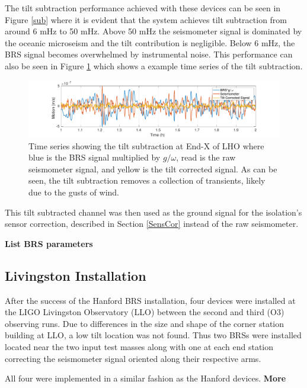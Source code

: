 \documentclass [12pt, proquest]{uwthesis}[2019]
\begin{document}
The tilt subtraction performance achieved with these devices can be seen in Figure \ref{sub} where it is evident that the system achieves tilt subtraction from around 6 mHz to 50 mHz. Above 50 mHz the seismometer signal is dominated by the oceanic microseism and the tilt contribution is negligible. Below 6 mHz, the BRS signal becomes overwhelmed by instrumental noise. This performance can also be seen in Figure \ref{subTime} which shows a example time series of the tilt subtraction. 

\begin{figure}%
\begin{center}
\includegraphics[width=\textwidth]{TiltCorrTime.pdf}
\caption[Time series showing tilt subtraction ]{Time series showing the tilt subtraction at End-X of LHO where blue is the BRS signal multiplied by $g/\omega$, read is the raw seismometer signal, and yellow is the tilt corrected signal. As can be seen, the tilt subtraction removes a collection of transients, likely due to the gusts of wind.}
\label{subTime}
\end{center}
\end{figure}

This tilt subtracted channel was then used as the ground signal for the isolation's sensor correction, described in Section \ref{SensCor} instead of the raw seismometer.

\textbf{List BRS parameters}


\subsection{Livingston Installation}

\quad After the success of the Hanford BRS installation, four devices were installed at the LIGO Livingston Observatory (LLO) between the second and third (O3) observing runs. Due to differences in the size and shape of the corner station building at LLO, a low tilt location was not found. Thus two BRSs were installed located near the two input test masses along with one at each end station correcting the seismometer signal oriented along their respective arms. 

All four were implemented in a similar fashion as the Hanford devices. \textbf{More}
\end{document}
